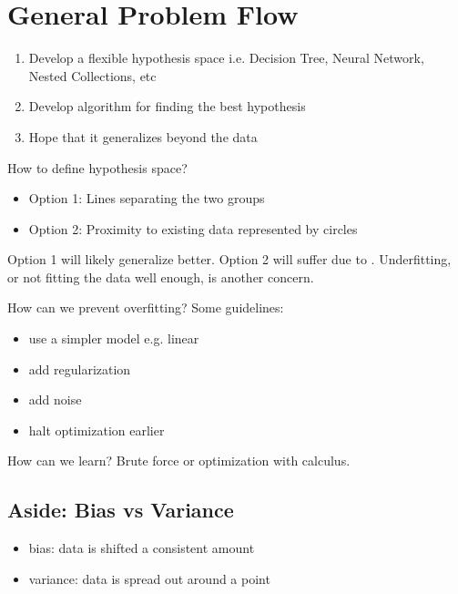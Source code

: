 \section{General Problem Flow}
\begin{enumerate}
    \item Develop a flexible hypothesis space i.e. Decision Tree, Neural Network, Nested Collections, etc
    \item Develop algorithm for finding the best hypothesis
    \item Hope that it generalizes beyond the data
\end{enumerate}

\begin{example}
    \begin{center}
    \end{center}
    How to define hypothesis space?
    \begin{itemize}
        \item Option 1: Lines separating the two groups
        \item Option 2: Proximity to existing data represented by circles
    \end{itemize}
    Option 1 will likely generalize better. Option 2 will suffer due to . Underfitting, or not fitting the data well enough, is another concern.

    How can we prevent overfitting? Some guidelines:
    \begin{itemize}
        \item use a simpler model e.g. linear
        \item add regularization
        \item add noise
        \item halt optimization earlier
    \end{itemize}

    How can we learn? Brute force or optimization with calculus.
\end{example}

\subsection*{Aside: Bias vs Variance}
\begin{itemize}
    \item bias: data is shifted a consistent amount
    \item variance: data is spread out around a point
\end{itemize}